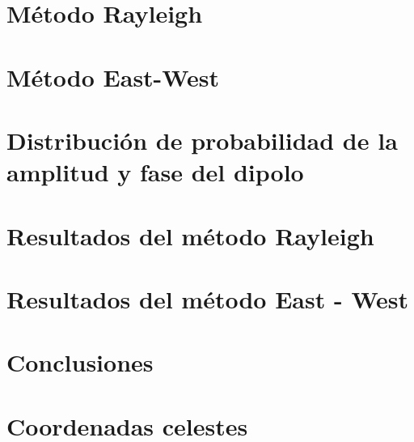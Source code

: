 \documentclass[12pt,papel,oneside]{ibtesis}
\begin{document}
\chapter{Método Rayleigh}
	\graphicspath{{../06_MetodoRayleigh/}}
	

\chapter{Método East-West}
	\graphicspath{{../EW/}}
	
	
\chapter{Distribución de probabilidad de la amplitud y fase del dipolo} \label{PDFs}
	\graphicspath{{../EW/}}
	

\chapter{Resultados del método Rayleigh}


\chapter{Resultados del método East - West}
	\graphicspath{{../EW/}}	
	

\chapter{Conclusiones}
% 	

\appendix
	\chapter{Coordenadas celestes}
	

\begin{biblio}
	
\end{biblio}
\end{document}
